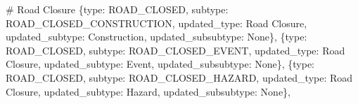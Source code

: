 \documentclass[
  letterpaper,
  DIV=11,
  numbers=noendperiod]{scrartcl}
\newenvironment{Shaded}{\begin{snugshade}}{\end{snugshade}}
\newcommand{\CommentTok}[1]{\textcolor[rgb]{0.37,0.37,0.37}{#1}}
\newcommand{\NormalTok}[1]{\textcolor[rgb]{0.00,0.23,0.31}{#1}}
\newcommand{\StringTok}[1]{\textcolor[rgb]{0.13,0.47,0.30}{#1}}
\newcommand{\VariableTok}[1]{\textcolor[rgb]{0.07,0.07,0.07}{#1}}
\begin{document}
\begin{Shaded}
\begin{Highlighting}[]
    \CommentTok{\# Road Closure}
\NormalTok{    \{}\StringTok{\textquotesingle{}type\textquotesingle{}}\NormalTok{: }\StringTok{\textquotesingle{}ROAD\_CLOSED\textquotesingle{}}\NormalTok{, }\StringTok{\textquotesingle{}subtype\textquotesingle{}}\NormalTok{: }\StringTok{\textquotesingle{}ROAD\_CLOSED\_CONSTRUCTION\textquotesingle{}}\NormalTok{, }
     \StringTok{\textquotesingle{}updated\_type\textquotesingle{}}\NormalTok{: }\StringTok{\textquotesingle{}Road Closure\textquotesingle{}}\NormalTok{, }\StringTok{\textquotesingle{}updated\_subtype\textquotesingle{}}\NormalTok{: }\StringTok{\textquotesingle{}Construction\textquotesingle{}}\NormalTok{, }\StringTok{\textquotesingle{}updated\_subsubtype\textquotesingle{}}\NormalTok{: }\VariableTok{None}\NormalTok{\},}
\NormalTok{    \{}\StringTok{\textquotesingle{}type\textquotesingle{}}\NormalTok{: }\StringTok{\textquotesingle{}ROAD\_CLOSED\textquotesingle{}}\NormalTok{, }\StringTok{\textquotesingle{}subtype\textquotesingle{}}\NormalTok{: }\StringTok{\textquotesingle{}ROAD\_CLOSED\_EVENT\textquotesingle{}}\NormalTok{, }
     \StringTok{\textquotesingle{}updated\_type\textquotesingle{}}\NormalTok{: }\StringTok{\textquotesingle{}Road Closure\textquotesingle{}}\NormalTok{, }\StringTok{\textquotesingle{}updated\_subtype\textquotesingle{}}\NormalTok{: }\StringTok{\textquotesingle{}Event\textquotesingle{}}\NormalTok{, }\StringTok{\textquotesingle{}updated\_subsubtype\textquotesingle{}}\NormalTok{: }\VariableTok{None}\NormalTok{\},}
\NormalTok{    \{}\StringTok{\textquotesingle{}type\textquotesingle{}}\NormalTok{: }\StringTok{\textquotesingle{}ROAD\_CLOSED\textquotesingle{}}\NormalTok{, }\StringTok{\textquotesingle{}subtype\textquotesingle{}}\NormalTok{: }\StringTok{\textquotesingle{}ROAD\_CLOSED\_HAZARD\textquotesingle{}}\NormalTok{, }
     \StringTok{\textquotesingle{}updated\_type\textquotesingle{}}\NormalTok{: }\StringTok{\textquotesingle{}Road Closure\textquotesingle{}}\NormalTok{, }\StringTok{\textquotesingle{}updated\_subtype\textquotesingle{}}\NormalTok{: }\StringTok{\textquotesingle{}Hazard\textquotesingle{}}\NormalTok{, }\StringTok{\textquotesingle{}updated\_subsubtype\textquotesingle{}}\NormalTok{: }\VariableTok{None}\NormalTok{\},}
    

\end{Highlighting}
\end{Shaded}
\end{document}
